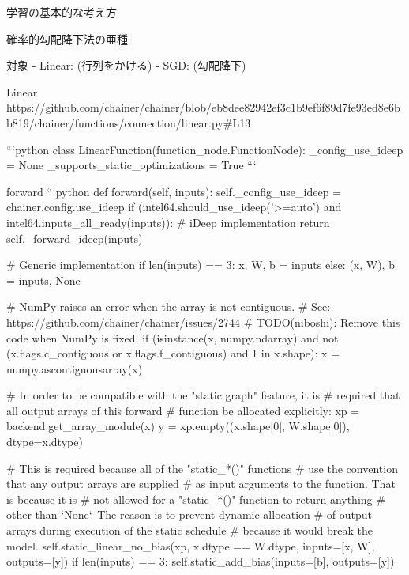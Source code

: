 \begin{frame}[fragile]{学習の基本的な考え方}
\begin{frame}[fragile]{確率的勾配降下法の亜種}
\begin{frame}[fragile]{}
\end{frame}
\begin{frame}[fragile]{}対象
- Linear: (行列をかける)
- SGD: (勾配降下)



\end{frame}
\begin{frame}[fragile]{}Linear
https://github.com/chainer/chainer/blob/eb8dee82942ef3c1b9ef6f89d7fe93ed8e6bb819/chainer/functions/connection/linear.py#L13

```python
class LinearFunction(function_node.FunctionNode):
    _config_use_ideep = None
    _supports_static_optimizations = True
```
\end{frame}
\begin{frame}[fragile]{}forward
```python
   def forward(self, inputs):
        self._config_use_ideep = chainer.config.use_ideep
        if (intel64.should_use_ideep('>=auto')
                and intel64.inputs_all_ready(inputs)):
            # iDeep implementation
            return self._forward_ideep(inputs)

        # Generic implementation
        if len(inputs) == 3:
            x, W, b = inputs
        else:
            (x, W), b = inputs, None

        # NumPy raises an error when the array is not contiguous.
        # See: https://github.com/chainer/chainer/issues/2744
        # TODO(niboshi): Remove this code when NumPy is fixed.
        if (isinstance(x, numpy.ndarray) and
                not (x.flags.c_contiguous or x.flags.f_contiguous) and
                1 in x.shape):
            x = numpy.ascontiguousarray(x)

        # In order to be compatible with the "static graph" feature, it is
        # required that all output arrays of this forward
        # function be allocated explicitly:
        xp = backend.get_array_module(x)
        y = xp.empty((x.shape[0], W.shape[0]), dtype=x.dtype)

        # This is required because all of the "static_*()" functions
        # use the convention that any output arrays are supplied
        # as input arguments to the function. That is because it is
        # not allowed for a "static_*()" function to return anything
        # other than `None`. The reason is to prevent dynamic allocation
        # of output arrays during execution of the static schedule
        # because it would break the model.
        self.static_linear_no_bias(xp, x.dtype == W.dtype, inputs=[x, W],
                                   outputs=[y])
        if len(inputs) == 3:
            self.static_add_bias(inputs=[b], outputs=[y])


\end{frame}
\end{frame}
\end{frame}
